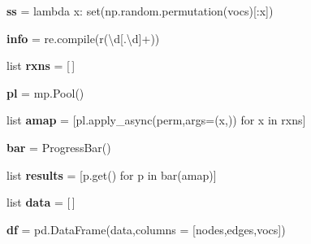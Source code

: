 \begin{DoxyCompactItemize}
{\bfseries ss} = lambda x\+: set(np.\+random.\+permutation(vocs)\mbox{[}\+:x\mbox{]})
\item 
\mbox{\label{namespacedsmacc_1_1graph_1_1permutate_aa87f827b9f8261c86c648787a7a826f5}} 
{\bfseries info} = re.\+compile(r\textquotesingle{}(\textbackslash{}d\mbox{[}.\textbackslash{}d\mbox{]}+)\textquotesingle{})
\item 
\mbox{\label{namespacedsmacc_1_1graph_1_1permutate_a6eab2df62256d9109626eb60841c6bc6}} 
list {\bfseries rxns} = \mbox{[}$\,$\mbox{]}
\item 
\mbox{\label{namespacedsmacc_1_1graph_1_1permutate_a75dc25ac40c57f2c093d8eac5dbd3a57}} 
{\bfseries pl} = mp.\+Pool()
\item 
\mbox{\label{namespacedsmacc_1_1graph_1_1permutate_aff243054d57596677677c92224da3497}} 
list {\bfseries amap} = \mbox{[}pl.\+apply\+\_\+async(perm,args=(x,)) for x in rxns\mbox{]}
\item 
\mbox{\label{namespacedsmacc_1_1graph_1_1permutate_aad1f40368f81c08aaf560a1d6f3e7b17}} 
{\bfseries bar} = Progress\+Bar()
\item 
\mbox{\label{namespacedsmacc_1_1graph_1_1permutate_a7b4348008a5f7321f8afa3e2f44e0905}} 
list {\bfseries results} = \mbox{[}p.\+get() for p in bar(amap)\mbox{]}
\item 
\mbox{\label{namespacedsmacc_1_1graph_1_1permutate_ab7eb7451751c053a766f710c53ab6dc7}} 
list {\bfseries data} = \mbox{[}$\,$\mbox{]}
\item 
\mbox{\label{namespacedsmacc_1_1graph_1_1permutate_a270992ad5ee9d1537ae28156e2e0f921}} 
{\bfseries df} = pd.\+Data\+Frame(data,columns = \mbox{[}\textquotesingle{}nodes\textquotesingle{},\textquotesingle{}edges\textquotesingle{},\textquotesingle{}vocs\textquotesingle{}\mbox{]})
\item 
\mbox{\label{namespacedsmacc_1_1graph_1_1permutate_a9a3f9c95cf2c290aa1424d6e79b233d7}} 

\end{DoxyCompactItemize}
